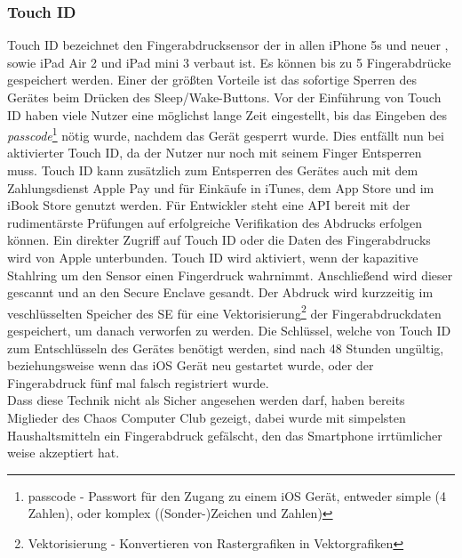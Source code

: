 	\subsubsection{Touch ID}\label{sec:touch_id}
		Touch ID bezeichnet den Fingerabdrucksensor der in allen iPhone 5s und neuer
		, sowie iPad Air 2 und iPad mini 3 verbaut ist. Es können bis zu 5
		Fingerabdrücke gespeichert werden. Einer der größten Vorteile ist das
		sofortige Sperren des Gerätes beim Drücken des Sleep/Wake-Buttons. Vor der
		Einführung von Touch ID haben viele Nutzer eine möglichst lange Zeit
		eingestellt, bis das Eingeben des \textsl{passcode}\footnote{passcode -
		Passwort für den Zugang zu einem iOS Gerät, entweder simple (4 Zahlen), oder
		komplex ((Sonder-)Zeichen und Zahlen)} nötig wurde, nachdem das Gerät gesperrt
		wurde. Dies entfällt nun bei aktivierter Touch ID, da der Nutzer nur noch mit
		seinem Finger Entsperren muss.
		Touch ID kann zusätzlich zum Entsperren des Gerätes auch mit dem Zahlungsdienst Apple
		Pay und für Einkäufe in iTunes, dem App Store und im iBook Store genutzt
		werden. Für Entwickler steht eine API bereit mit der rudimentärste
		Prüfungen auf erfolgreiche Verifikation des Abdrucks erfolgen können. Ein
		direkter Zugriff auf Touch ID oder die Daten des Fingerabdrucks wird von
		Apple unterbunden. Touch ID wird aktiviert, wenn der kapazitive Stahlring um
		den Sensor einen Fingerdruck wahrnimmt. Anschließend wird dieser gescannt und
		an den Secure Enclave gesandt. Der Abdruck wird kurzzeitig im veschlüsselten
		Speicher des SE für eine Vektorisierung\footnote{Vektorisierung - Konvertieren
		von Rastergrafiken in Vektorgrafiken} der Fingerabdruckdaten gespeichert, um
		danach verworfen zu werden.
		Die Schlüssel, welche von Touch ID zum Entschlüsseln des Gerätes benötigt
		werden, sind nach 48 Stunden ungültig, beziehungsweise wenn das iOS Gerät neu
		gestartet wurde, oder der Fingerabdruck fünf mal falsch registriert wurde.\\
		Dass diese Technik nicht als Sicher angesehen werden darf, haben bereits
		Miglieder des Chaos Computer Club gezeigt\cite{CCCBreakTouch2015}, dabei 
		wurde mit simpelsten Haushaltsmitteln ein Fingerabdruck gefälscht, den das
		Smartphone irrtümlicher weise akzeptiert hat.
